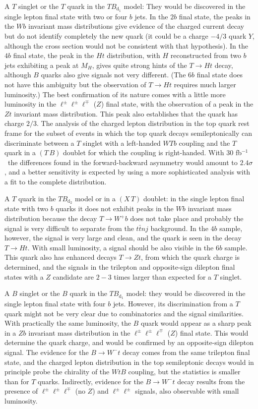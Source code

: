 \documentclass[12pt,a4paper]{article}
\newcommand{\fbin}{fb$^{-1}$}
\newcommand{\TBd}{TB_{\text{d}_1}}
\newcommand{\TBD}{TB_{\text{d}_2}}
\newcommand{\TB}{(T \, B)}
\newcommand{\XT}{(X \, T)}
\begin{document}
A $T$ singlet or the $T$ quark in the $\TBd$ model: They would be discovered in the single lepton final state with two or four $b$ jets. In the $2b$ final state, the peaks in the $Wb$ invariant mass distributions give evidence of the charged current decay but do not identify completely the new quark (it could be a charge $-4/3$ quark $Y$, although the cross section would not be consistent with that hypothesis). In the $4b$ final state, the peak in the $Ht$ distribution, with $H$ reconstructed from two $b$ jets exhibiting a peak at $M_H$, gives quite strong hints of the $T \to Ht$ decay, although $B$ quarks also give signals not very different. (The $6b$ final state does not have this ambiguity but the observation of $T \to Ht$ requires much larger luminosity.)
The best confirmation of its nature comes with a little more luminosity in the $\ell^\pm \ell^\pm \ell^\mp$ ($Z$) final state, with the observation of a peak in the $Zt$ invariant mass distribution. This peak also establishes that the quark has charge $2/3$. The analysis of the charged lepton distribution in the top quark rest frame for the subset of events in which the top quark decays semileptonically can discriminate between a $T$ singlet with a left-handed $WTb$ coupling and the $T$ quark in a $\TB$ doublet for which the coupling is right-handed. With 30 \fbin\ the differences found in the forward-backward asymmetry would amount to $2.4\sigma$, and a better sensitivity is expected by using a more sophisticated analysis with a fit to the complete distribution.

A $T$ quark in the $\TBD$ model or in a $\XT$ doublet: in the single lepton final state with two $b$ quarks it does not exhibit peaks in the $Wb$ invariant mass distribution because the decay $T \to W^+ b$ does not take place and probably the signal is very difficult to separate from the $t \bar t nj$ background. In the $4b$ sample, however, the signal is very large and clean, and the quark is seen in the decay $T \to Ht$. With small luminosity, a signal should be also visible in the $6b$ sample. This quark also has enhanced decays $T \to Zt$, from which the quark charge is determined, and the signals in the trilepton and opposite-sign dilepton final states with a $Z$ candidate are $2-3$ times larger than expected for a $T$ singlet.

A $B$ singlet or the $B$ quark in the $\TBd$ model: they would be discovered in the single lepton final state with four $b$ jets. However, its discrimination from a $T$ quark might not be very clear due to combinatorics and the signal similarities. With practically the same luminosity, the $B$ quark would appear as a sharp peak in a $Zb$ invariant mass distribution in the $\ell^\pm \ell^\pm \ell^\mp$ ($Z$) final state. This would determine the quark charge, and would be confirmed by an opposite-sign dilepton signal. The evidence for the $B \to W^- t$ decay comes from the same trilepton final state, and the
charged lepton distribution in the top semileptonic decays would in principle probe the chirality of the $WtB$ coupling, but the statistics is smaller than for $T$ quarks.
Indirectly, evidence for the $B \to W^- t$ decay results from the presence of $\ell^\pm \ell^\pm \ell^\mp$ (no $Z$) and $\ell^\pm \ell^\pm$ signals, also observable with small luminosity. 
\end{document}
